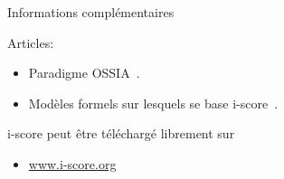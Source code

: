 \begin{block}{Informations complémentaires}
      \small{Articles:
      \begin{itemize}
        \item Paradigme OSSIA~\cite{celerier_ossia:_2015}.
        \item Modèles formels sur lesquels se base i-score~\cite{allombert_system_2007,arias_modelling_2014}.
      \end{itemize}
      \vspace{0.1in}\noindent i-score peut être téléchargé librement sur
      \begin{itemize}
        \item \url{www.i-score.org}
      \end{itemize}}
\end{block}